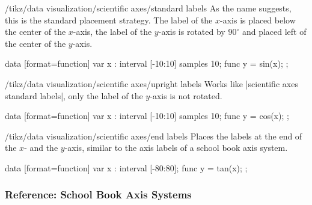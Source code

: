 \begin{key}{/tikz/data visualization/scientific axes/standard labels}
    As the name suggests, this is the standard placement strategy. The label of
    the $x$-axis is placed below the center of the $x$-axis, the label of the
    $y$-axis is rotated by $90^\circ$ and placed left of the center of the
    $y$-axis.
\begin{codeexample}[width=8cm]
\tikz \datavisualization
 [scientific axes={clean, standard labels},
  visualize as smooth line,
  x axis={label=degree $d$,
    ticks={tick unit={}^\circ}},
  y axis={label=$\sin d$}]
data [format=function] {
  var x : interval [-10:10] samples 10;
  func y = sin(\value x);
};
\end{codeexample}
\end{key}

\begin{key}{/tikz/data visualization/scientific axes/upright labels}
    Works like |scientific axes standard labels|, only the label of the
    $y$-axis is not rotated.
\begin{codeexample}[width=8cm]
\tikz \datavisualization [
  scientific axes={clean, upright labels},
  visualize as smooth line,
  x axis={label=degree $d$,
    ticks={tick unit={}^\circ}},
  y axis={label=$\cos d$, include value=1,
    ticks={style={
        /pgf/number format/precision=4,
        /pgf/number format/fixed zerofill}}}]
data [format=function] {
  var x : interval [-10:10] samples 10;
  func y = cos(\value x);
};
\end{codeexample}
\end{key}

\begin{key}{/tikz/data visualization/scientific axes/end labels}
    Places the labels at the end of the $x$- and the $y$-axis, similar to the
    axis labels of a school book axis system.
\begin{codeexample}[width=8cm]
\tikz \datavisualization [
  scientific axes={clean, end labels},
  visualize as smooth line,
  x axis={label=degree $d$,
    ticks={tick unit={}^\circ}},
  y axis={label=$\tan d$}]
data [format=function] {
  var x : interval [-80:80];
  func y = tan(\value x);
};
\end{codeexample}
\end{key}


\subsubsection{Reference: School Book Axis Systems}

